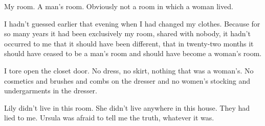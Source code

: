 {My room. A man’s room. Obviously not a room in which a woman lived.

I hadn’t guessed earlier that evening when I had changed my clothes. Because for so many years it had been exclusively my room, shared with nobody, it hadn’t occurred to me that it should have been different, that in twenty-two months it should have ceased to be a man’s room and should have become a woman’s room.

I tore open the closet door. No dress, no skirt, nothing that was a woman’s. No cosmetics and brushes and combs on the dresser and no women’s stocking and undergarments in the dresser.

Lily didn’t live in this room. She didn’t live anywhere in this house. They had lied to me. Ursula was afraid to tell me the truth, whatever it was.

}

\vspace{2\nbs}
\clearpage
\thispagestyle{empty}


